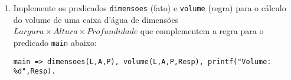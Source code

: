 \documentclass[11pt, a4paper,final]{article}
\begin{document}
\begin{enumerate}
\begin{enumerate}
	\item Implemente os predicados {\tt dimensoes} (fato) e {\tt volume} (regra) para o cálculo do volume de uma caixa d'água de dimensões 
	$Largura \times Altura \times Profundidade$ que complementem a regra para o predicado {\tt main} abaixo:
	
	{\tt main => dimensoes(L,A,P), volume(L,A,P,Resp), printf("Volume: \%d",Resp).}
	


  
		

\end{enumerate}
\end{enumerate}
\end{document}

